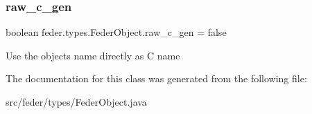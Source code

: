 \subsubsection{\texorpdfstring{raw\+\_\+c\+\_\+gen}{raw\_c\_gen}}
{\footnotesize\ttfamily boolean feder.\+types.\+Feder\+Object.\+raw\+\_\+c\+\_\+gen = false}

Use the object\textquotesingle{}s name directly as C name 

The documentation for this class was generated from the following file\+:\begin{DoxyCompactItemize}
\item 
src/feder/types/Feder\+Object.\+java\end{DoxyCompactItemize}
